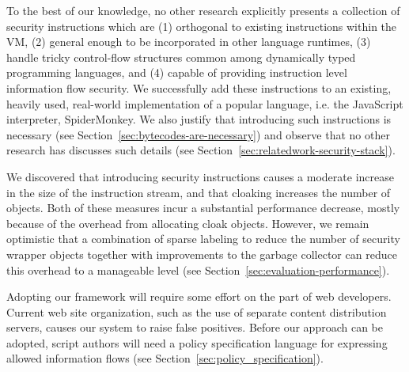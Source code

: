 To the best of our knowledge, no other research explicitly presents a collection of security instructions which are (1) orthogonal to existing instructions within the VM, (2) general enough to be incorporated in other language runtimes, (3) handle tricky control-flow structures common among dynamically typed programming languages, and (4) capable of providing instruction level information flow security.
We successfully add these instructions to an existing, heavily used, real-world implementation of a popular language, i.e. the JavaScript interpreter, SpiderMonkey.
We also justify that introducing such instructions is necessary (see Section~\ref{sec:bytecodes-are-necessary}) and observe that no other research has discusses such details (see Section~\ref{sec:relatedwork-security-stack}).

We discovered that introducing security instructions causes a moderate increase in the size of the instruction stream, and that cloaking increases the number of objects.
Both of these measures incur a substantial performance decrease, mostly because of the overhead from allocating cloak objects.
However, we remain optimistic that a combination of sparse labeling to reduce the number of security wrapper objects together with improvements to the garbage collector can reduce this overhead to a manageable level (see Section~\ref{sec:evaluation-performance}).

Adopting our framework will require some effort on the part of web developers.
Current web site organization, such as the use of separate content distribution servers, causes our system to raise false positives.
Before our approach can be adopted, script authors will need a policy specification language for expressing allowed information flows (see Section~\ref{sec:policy_specification}).

\begin{comment}
\begin{jscbytecode}
|\tikzmark{mylabelStart1}|[   0] enter|\tikzmark{mylabelEnd1}|
|\tikzmark{mylabelStart2}|[   0] enter|\tikzmark{mylabelEnd2}|
|\tikzmark{mylabelStart3}|[   0] enter|\tikzmark{mylabelEnd3}|
|\tikzmark{mylabelStart4}|[   0] enter|\tikzmark{mylabelEnd4}|
|\tikzmark{mylabelStart5}|[   0] enter|\tikzmark{mylabelEnd5}|
\end{jscbytecode}

\begin{tikz}[overlay, remember picture] {
  \draw[->, thick] ($(mylabelStart1)$) -- ($(mylabelEnd5)$);
}
\end{tikz}
\end{comment}


